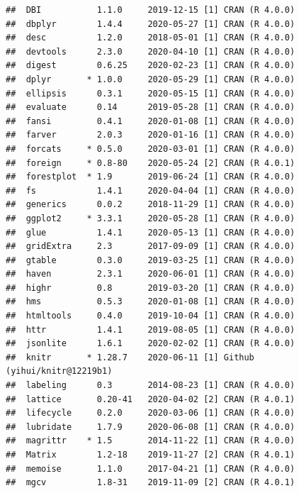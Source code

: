 \documentclass[
  10pt,
]{krantz}
\begin{document}
\begin{verbatim}
##  DBI           1.1.0     2019-12-15 [1] CRAN (R 4.0.0)                   
##  dbplyr        1.4.4     2020-05-27 [1] CRAN (R 4.0.0)                   
##  desc          1.2.0     2018-05-01 [1] CRAN (R 4.0.0)                   
##  devtools      2.3.0     2020-04-10 [1] CRAN (R 4.0.0)                   
##  digest        0.6.25    2020-02-23 [1] CRAN (R 4.0.0)                   
##  dplyr       * 1.0.0     2020-05-29 [1] CRAN (R 4.0.0)                   
##  ellipsis      0.3.1     2020-05-15 [1] CRAN (R 4.0.0)                   
##  evaluate      0.14      2019-05-28 [1] CRAN (R 4.0.0)                   
##  fansi         0.4.1     2020-01-08 [1] CRAN (R 4.0.0)                   
##  farver        2.0.3     2020-01-16 [1] CRAN (R 4.0.0)                   
##  forcats     * 0.5.0     2020-03-01 [1] CRAN (R 4.0.0)                   
##  foreign     * 0.8-80    2020-05-24 [2] CRAN (R 4.0.1)                   
##  forestplot  * 1.9       2019-06-24 [1] CRAN (R 4.0.0)                   
##  fs            1.4.1     2020-04-04 [1] CRAN (R 4.0.0)                   
##  generics      0.0.2     2018-11-29 [1] CRAN (R 4.0.0)                   
##  ggplot2     * 3.3.1     2020-05-28 [1] CRAN (R 4.0.0)                   
##  glue          1.4.1     2020-05-13 [1] CRAN (R 4.0.0)                   
##  gridExtra     2.3       2017-09-09 [1] CRAN (R 4.0.0)                   
##  gtable        0.3.0     2019-03-25 [1] CRAN (R 4.0.0)                   
##  haven         2.3.1     2020-06-01 [1] CRAN (R 4.0.0)                   
##  highr         0.8       2019-03-20 [1] CRAN (R 4.0.0)                   
##  hms           0.5.3     2020-01-08 [1] CRAN (R 4.0.0)                   
##  htmltools     0.4.0     2019-10-04 [1] CRAN (R 4.0.0)                   
##  httr          1.4.1     2019-08-05 [1] CRAN (R 4.0.0)                   
##  jsonlite      1.6.1     2020-02-02 [1] CRAN (R 4.0.0)                   
##  knitr       * 1.28.7    2020-06-11 [1] Github (yihui/knitr@12219b1)     
##  labeling      0.3       2014-08-23 [1] CRAN (R 4.0.0)                   
##  lattice       0.20-41   2020-04-02 [2] CRAN (R 4.0.1)                   
##  lifecycle     0.2.0     2020-03-06 [1] CRAN (R 4.0.0)                   
##  lubridate     1.7.9     2020-06-08 [1] CRAN (R 4.0.0)                   
##  magrittr    * 1.5       2014-11-22 [1] CRAN (R 4.0.0)                   
##  Matrix        1.2-18    2019-11-27 [2] CRAN (R 4.0.1)                   
##  memoise       1.1.0     2017-04-21 [1] CRAN (R 4.0.0)                   
##  mgcv          1.8-31    2019-11-09 [2] CRAN (R 4.0.1)                   

\end{verbatim}
\end{document}
